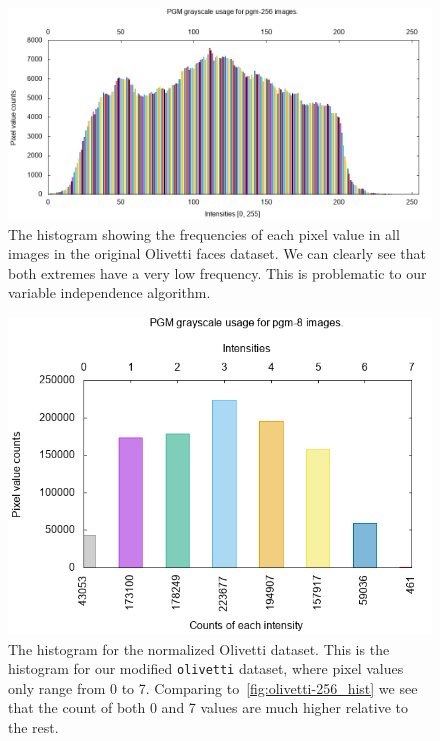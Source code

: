\documentclass{amsart}
\theoremstyle{plain}
\numberwithin{equation}{section}
\newcommand{\code}[1]{\lstinline[mathescape=true]{#1}}
\begin{document}
\begin{figure}[h]
  \centering\includegraphics[scale=0.45]{imgs/olivetti-256_hist.png}
  \captionsetup{singlelinecheck=false,justification=justified,margin=0cm}
  \caption{The histogram showing the frequencies of each pixel value in all images in the original
  Olivetti faces dataset. We can clearly see that both extremes have a very low frequency. This is
  problematic to our variable independence algorithm.}\label{fig:olivetti-256_hist}
\end{figure}

\begin{figure}[h]
  \centering\includegraphics[scale=0.65]{imgs/olivetti-8_hist.png}
  \captionsetup{singlelinecheck=false,justification=justified,margin=0cm}
  \caption{The histogram for the normalized Olivetti dataset. This is the histogram for our
  modified \code{olivetti} dataset, where pixel values only range from 0 to 7. Comparing
  to~\autoref{fig:olivetti-256_hist} we see that the count of both 0 and 7 values are much higher
  relative to the rest.}\label{fig:olivetti-8_hist}
\end{figure}
\end{document}
